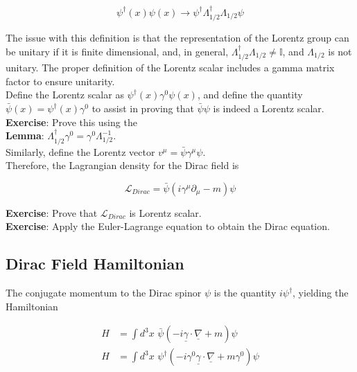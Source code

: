 \begin{equation}
\psi^\dagger (x) \psi (x) \rightarrow \psi^\dagger \Lambda_{1/2} ^\dagger \Lambda_{1/2} \psi
\end{equation}

\noindent The issue with this definition is that the representation of the Lorentz group can be unitary if it is finite dimensional, and, in general, $\Lambda_{1/2} ^\dagger \Lambda_{1/2}  \ne \mathbb{I}$, and $\Lambda_{1/2}$ is not unitary. The proper definition of the Lorentz scalar includes a gamma matrix factor to ensure unitarity. \\

\noindent  Define the Lorentz scalar as $\psi^\dagger (x) \gamma ^0 \psi (x)$, and define the quantity $\bar{\psi}(x) = \psi^\dagger (x) \gamma ^0$ to assist in proving that $\bar{\psi}\psi$ is indeed a Lorentz scalar.  \\

\noindent \textbf{Exercise}: Prove this using the \\

\textbf{Lemma}: $\Lambda_{1/2} ^\dagger \gamma^0 = \gamma^0 \Lambda_{1/2} ^{-1}$. \\

\noindent Similarly, define the Lorentz vector $v^\mu = \bar{\psi} \gamma^\mu \psi$. \\

\noindent Therefore, the Lagrangian density for the Dirac field is

\begin{equation}
\mathcal{L}_{Dirac} = \bar{\psi} \left( i \gamma^\mu \partial_\mu - m \right) \psi
\end{equation}

\noindent \textbf{Exercise}: Prove that $\mathcal{L}_{Dirac}$ is Lorentz scalar. \\
\noindent \textbf{Exercise}: Apply the Euler-Lagrange equation to obtain the Dirac equation. \\

\subsection*{Dirac Field Hamiltonian}

\noindent The conjugate momentum to the Dirac spinor $\psi$ is the quantity $i \psi^\dagger$, yielding the Hamiltonian

\begin{align}
H &= \int d^3 x \,\, \bar{\psi} \left( -i \underline{\gamma} \cdot \underline{\nabla} + m \right) \psi \\
H &= \int d^3 x \,\, \psi^\dagger \left( -i \gamma^0 \underline{\gamma} \cdot \underline{\nabla} + m \gamma^0 \right) \psi
\end{align}

